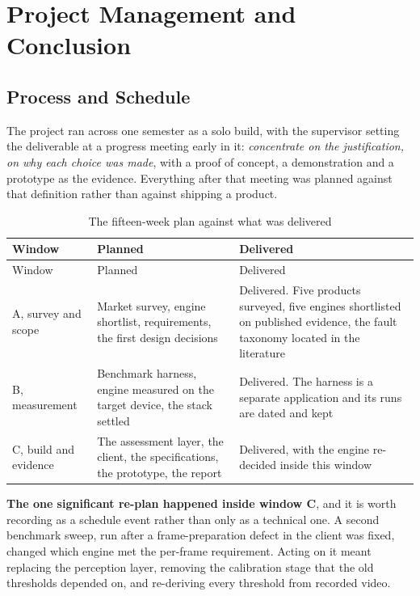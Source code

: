 \chapter{Project Management and Conclusion}
\label{chap:11}

\section{Process and Schedule}
\label{sec:11.1}

The project ran across one semester as a solo build, with the supervisor setting the deliverable at a progress meeting early in it: \textit{concentrate on the justification, on why each choice was made}, with a proof of concept, a demonstration and a prototype as the evidence. Everything after that meeting was planned against that definition rather than against shipping a product.

{\small
\setlength{\LTpre}{6pt}\setlength{\LTpost}{8pt}
\begin{longtable}{>{\raggedright\arraybackslash}p{}>{\raggedright\arraybackslash}p{}>{\raggedright\arraybackslash}p{}}
\caption{The fifteen-week plan against what was delivered}\\
\toprule
Window & Planned & Delivered \\
\midrule
\endfirsthead
\toprule
Window & Planned & Delivered \\
\midrule
\endhead
\bottomrule
\endfoot
\bottomrule
\endlastfoot
A, survey and scope & Market survey, engine shortlist, requirements, the first design decisions & Delivered. Five products surveyed, five engines shortlisted on published evidence, the fault taxonomy located in the literature \\
B, measurement & Benchmark harness, engine measured on the target device, the stack settled & Delivered. The harness is a separate application and its runs are dated and kept \\
C, build and evidence & The assessment layer, the client, the specifications, the prototype, the report & Delivered, with the engine re-decided inside this window \\
\end{longtable}
}

\textbf{The one significant re-plan happened inside window C}, and it is worth recording as a schedule event rather than only as a technical one. A second benchmark sweep, run after a frame-preparation defect in the client was fixed, changed which engine met the per-frame requirement. Acting on it meant replacing the perception layer, removing the calibration stage that the old thresholds depended on, and re-deriving every threshold from recorded video.

